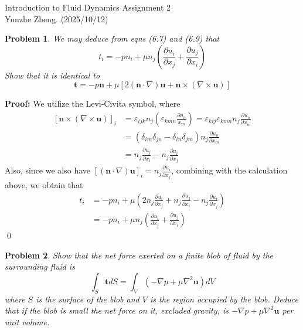 \documentclass[12pt]{article}
\newtheorem{problem}{Problem}
\begin{document}
\noindent Introduction to Fluid Dynamics \hfill Assignment 2\\
Yunzhe Zheng. (2025/10/12)

\hrulefill

\begin{problem}
    We may deduce from eqns (6.7) and (6.9) that 
    $$
        t_i=-pn_i+\mu n_j\left(\frac{\partial u_i}{\partial x_j}+\frac{\partial u_j}{\partial x_i}\right)
    $$
    Show that it is identical to 
    $$
        \textbf{t}=-p\textbf{n}+\mu[2(\textbf{n}\cdot\nabla)\textbf{u}+\textbf{n}\times (\nabla\times \textbf{u})]
    $$
\end{problem}

\textbf{Proof:} We utilize the Levi-Civita symbol, where
\begin{align*}
    \left[\textbf{n}\times(\nabla\times\textbf{u})\right]_i&= \varepsilon_{ijk}n_j\left(\varepsilon_{kmn}\frac{\partial u_n}{x_m}\right)=\varepsilon_{kij}\varepsilon_{kmn}n_j\frac{\partial u_n}{\partial x_m} \\
    &=(\delta_{im}\delta_{jn}-\delta_{in}\delta_{jm})n_j\frac{\partial u_n}{\partial x_m} \\
    &=n_j\frac{\partial u_j}{\partial x_i}- n_j\frac{\partial u_i}{\partial x_j}
\end{align*}
Also, since we also  have $\left[(\textbf{n}\cdot\nabla)\textbf{u}\right]_i=n_j\frac{\partial u_i}{\partial x_j}$, combining with the calculation above, we obtain that 
\begin{align*}
    t_i&=-pn_i+\mu\left(2n_j\frac{\partial u_i}{\partial x_j}+n_j\frac{\partial u_j}{\partial x_i}-n_j\frac{\partial u_i}{\partial x_j}\right) \\
    &=-pn_i+\mu n_j\left(\frac{\partial u_i}{\partial x_j}+\frac{\partial u_j}{\partial x_i}\right)
\end{align*} \qed
\\
\begin{problem}
    Show that the net force exerted on a finite blob of fluid by the surrounding fluid is 
    $$
        \int_S\textbf{t}dS=\int_V(-\nabla p+\mu\nabla^2\textbf{u})dV
    $$
    where $S$ is the surface of the blob and $V$ is the region occupied by the blob. Deduce that if the blob is small the net force on it, excluded gravity, is $-\nabla p+\mu\nabla^2\textbf{u}$ per unit volume.
\end{problem}
\end{document}
